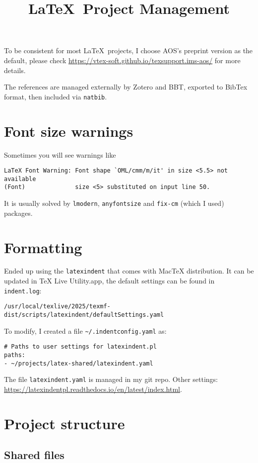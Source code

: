 \documentclass[aos,preprint]{imsart}
\begin{document}
\title{\LaTeX\ Project Management}

To be consistent for most \LaTeX\ projects,
I choose AOS's preprint version as the default, please check
\url{https://vtex-soft.github.io/texsupport.ims-aos/} for more details.

The references are managed externally by Zotero and BBT,
exported to BibTex format, then included via \verb|natbib|.

\section{Font size warnings}

Sometimes you will see warnings like
\begin{Verbatim}
LaTeX Font Warning: Font shape `OML/cmm/m/it' in size <5.5> not available
(Font)              size <5> substituted on input line 50.
\end{Verbatim}

It is usually solved by \verb|lmodern|, \verb|anyfontsize| and \verb|fix-cm| (which I used) packages.

\section{Formatting}

Ended up using the \verb|latexindent| that comes with MacTeX distribution.
It can be updated in TeX Live Utility.app, the default settings can be found in \verb|indent.log|:
\begin{Verbatim}
/usr/local/texlive/2025/texmf-dist/scripts/latexindent/defaultSettings.yaml
\end{Verbatim}

To modify, I created a file \verb|~/.indentconfig.yaml| as:
\begin{Verbatim}
# Paths to user settings for latexindent.pl
paths:
- ~/projects/latex-shared/latexindent.yaml
\end{Verbatim}

The file \verb|latexindent.yaml| is managed in my git repo.
Other settings: \url{https://latexindentpl.readthedocs.io/en/latest/index.html}.

\section{Project structure}

\subsection{Shared files}
\end{document}
